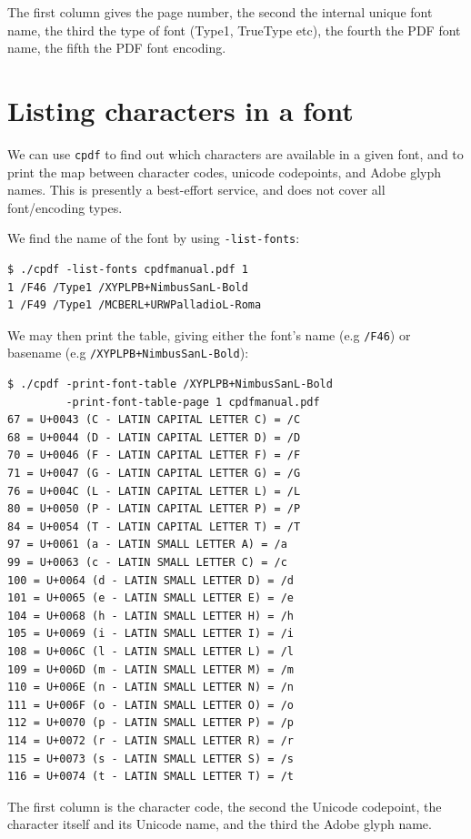 \documentclass{book}
\begin{document}
\noindent The first column gives the page number, the second the internal unique font
name, the third the type of font (Type1, TrueType etc), the fourth the PDF font
name, the fifth the PDF font encoding.

\section{Listing characters in a font}
We can use \texttt{cpdf} to find out which characters are available in a given font, and to print the map between character codes, unicode codepoints, and Adobe glyph names. This is presently a best-effort service, and does not cover all font/encoding types.

We find the name of the font by using \texttt{-list-fonts}:

{\small\begin{verbatim}
$ ./cpdf -list-fonts cpdfmanual.pdf 1
1 /F46 /Type1 /XYPLPB+NimbusSanL-Bold 
1 /F49 /Type1 /MCBERL+URWPalladioL-Roma 
\end{verbatim}}

\noindent We may then print the table, giving either the font's name (e.g \texttt{/F46}) or basename (e.g \texttt{/XYPLPB+NimbusSanL-Bold}):

{\small\begin{verbatim}
$ ./cpdf -print-font-table /XYPLPB+NimbusSanL-Bold
         -print-font-table-page 1 cpdfmanual.pdf
67 = U+0043 (C - LATIN CAPITAL LETTER C) = /C
68 = U+0044 (D - LATIN CAPITAL LETTER D) = /D
70 = U+0046 (F - LATIN CAPITAL LETTER F) = /F
71 = U+0047 (G - LATIN CAPITAL LETTER G) = /G
76 = U+004C (L - LATIN CAPITAL LETTER L) = /L
80 = U+0050 (P - LATIN CAPITAL LETTER P) = /P
84 = U+0054 (T - LATIN CAPITAL LETTER T) = /T
97 = U+0061 (a - LATIN SMALL LETTER A) = /a
99 = U+0063 (c - LATIN SMALL LETTER C) = /c
100 = U+0064 (d - LATIN SMALL LETTER D) = /d
101 = U+0065 (e - LATIN SMALL LETTER E) = /e
104 = U+0068 (h - LATIN SMALL LETTER H) = /h
105 = U+0069 (i - LATIN SMALL LETTER I) = /i
108 = U+006C (l - LATIN SMALL LETTER L) = /l
109 = U+006D (m - LATIN SMALL LETTER M) = /m
110 = U+006E (n - LATIN SMALL LETTER N) = /n
111 = U+006F (o - LATIN SMALL LETTER O) = /o
112 = U+0070 (p - LATIN SMALL LETTER P) = /p
114 = U+0072 (r - LATIN SMALL LETTER R) = /r
115 = U+0073 (s - LATIN SMALL LETTER S) = /s
116 = U+0074 (t - LATIN SMALL LETTER T) = /t
\end{verbatim}}

\noindent The first column is the character code, the second the Unicode codepoint, the character itself and its Unicode name, and the third the Adobe glyph name.
\end{document}
